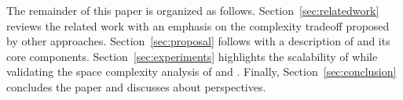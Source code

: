 The remainder of this paper is organized as
follows. Section~\ref{sec:relatedwork} reviews the related work with an emphasis
on the complexity tradeoff proposed by other
approaches. Section~\ref{sec:proposal} follows with a description of \CRATE and
its core components. Section~\ref{sec:experiments} highlights the scalability of
\CRATE while validating the space complexity analysis of \LSEQ and
\SPRAY. Finally, Section~\ref{sec:conclusion} concludes the paper and discusses
about perspectives.

